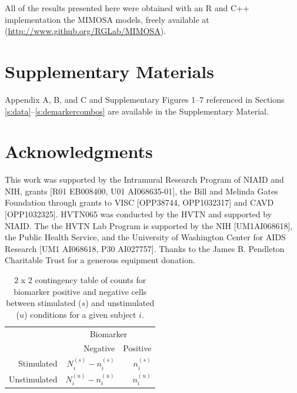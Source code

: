\documentclass[12pt,oupdraft]{biostatistics}
\begin{document}
All of the results presented here were obtained with an R and C++ implementation the MIMOSA models, freely available at (\url{http://www.github.org/RGLab/MIMOSA}).

\section*{Supplementary Materials}

Appendix A, B, and C and Supplementary Figures 1--7 referenced in Sections \ref{s:data}--\ref{s:demarkercombos} are available in the Supplementary Material.\vspace*{-8pt}

\section*{Acknowledgments}
This work was supported by the Intramural Research Program of NIAID and NIH, grants [R01 EB008400, U01 AI068635-01], the Bill and Melinda Gates Foundation through grants to VISC [OPP38744,  OPP1032317] and CAVD [OPP1032325].  HVTN065 was conducted by the HVTN and supported by NIAID. The the HVTN Lab Program is supported by the NIH [UM1AI068618], the Public Health Service, and the University of Washington Center for AIDS Research [UM1 AI068618, P30 AI027757]. Thanks to the James B. Pendleton Charitable Trust for a generous equipment donation.

%

\clearpage
\begin{table}[ht]
\centering
\parbox{0.8\linewidth}{
\caption{2 x 2 contingency table of counts for biomarker positive and negative cells between stimulated ($s$) and unstimulated ($u$) conditions for a given subject $i$.}\label{tab:twobytwo}
\centering
\begin{tabular}{rrr}

  \hline
\multicolumn{1}{l}{}&
\multicolumn{2}{c}{Biomarker}\\
 & Negative & Positive \\
  \hline
Stimulated &   $N^{(s)}_{i} - n^{(s)}_{i}$ &   $n^{(s)}_{i}$ \\
Unstimulated &   $N^{(u)}_{i}-n^{(u)}_{i}$ &   $n^{(u)}_{i}$ \\
   \hline
\end{tabular}
}
\end{table}
\end{document}
